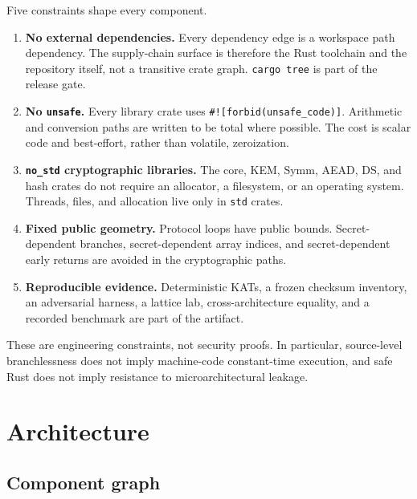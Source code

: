 \documentclass[11pt,a4paper]{article}
\theoremstyle{plain}
\theoremstyle{definition}
\theoremstyle{remark}
\begin{document}
Five constraints shape every component.

\begin{enumerate}[leftmargin=*]
\item \textbf{No external dependencies.}  Every dependency edge is a
  workspace path dependency.  The supply-chain surface is therefore the
  Rust toolchain and the repository itself, not a transitive crate
  graph.  \texttt{cargo tree} is part of the release gate.

\item \textbf{No \texttt{unsafe}.}  Every library crate uses
  \texttt{\#![forbid(unsafe\_code)]}.  Arithmetic and conversion paths
  are written to be total where possible.  The cost is scalar code and
  best-effort, rather than volatile, zeroization.

\item \textbf{\texttt{no\_std} cryptographic libraries.}  The core,
  KEM, Symm, AEAD, DS, and hash crates do not require an allocator, a
  filesystem, or an operating system.  Threads, files, and allocation
  live only in \texttt{std} crates.

\item \textbf{Fixed public geometry.}  Protocol loops have public
  bounds.  Secret-dependent branches, secret-dependent array indices,
  and secret-dependent early returns are avoided in the cryptographic
  paths.

\item \textbf{Reproducible evidence.}  Deterministic KATs, a frozen
  checksum inventory, an adversarial harness, a lattice lab,
  cross-architecture equality, and a recorded benchmark are part of the
  artifact.
\end{enumerate}

These are engineering constraints, not security proofs.  In particular,
source-level branchlessness does not imply machine-code constant-time
execution, and safe Rust does not imply resistance to microarchitectural
leakage.

\section{Architecture}
\label{sec:architecture}

\subsection{Component graph}
\end{document}
